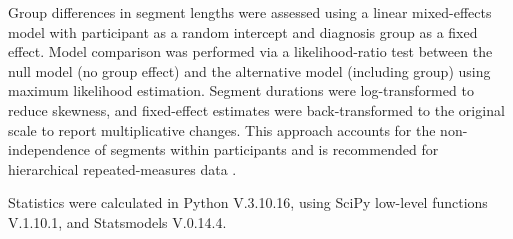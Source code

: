 \documentclass[runningheads]{llncs}
\begin{document}
Group differences in segment lengths were assessed using a linear mixed-effects model with participant as a random intercept and diagnosis group as a fixed effect. Model comparison was performed via a likelihood-ratio test between the null model (no group effect) and the alternative model (including group) using maximum likelihood estimation. Segment durations were log-transformed to reduce skewness, and fixed-effect estimates were back-transformed to the original scale to report multiplicative changes. This approach accounts for the non-independence of segments within participants and is recommended for hierarchical repeated-measures data \cite{Gelman2006,BAAYEN2008390}.

Statistics were calculated in Python V.3.10.16, using SciPy low-level functions V.1.10.1, and Statsmodels V.0.14.4.




\end{document}
